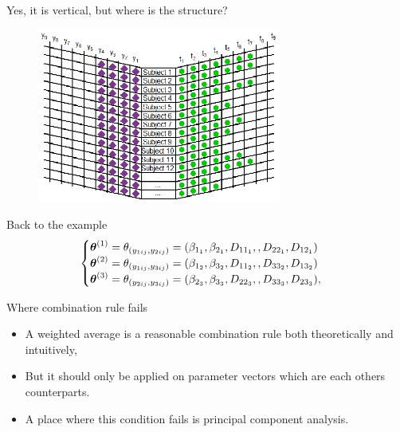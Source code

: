 \documentclass{beamer}
\newcommand{\bftheta}{\mbox{\boldmath $\theta$}}
\begin{document}
\begin{frame}{Yes, it is vertical, but where is the structure?}
\begin{figure}
\centering
\includegraphics[width=8cm]{long.eps}
\end{figure} 
\end{frame}

\begin{frame}{Back to the example}
\begin{equation*}
\begin{cases}
\bftheta^{(1)}=\theta_{(y_{1ij},y_{2ij})} = (\beta_{1_1},\beta_{2_1},D_{11_1},
,D_{22_1},D_{12_1}) \\
\bftheta^{(2)}=\theta_{(y_{1ij},y_{3ij})} = (\beta_{1_2},\beta_{3_2},D_{11_2},
,D_{33_2},D_{13_2}) \\
\bftheta^{(3)}=\theta_{(y_{2ij},y_{3ij})} = (\beta_{2_3},\beta_{3_3},D_{22_3},
,D_{33_3},D_{23_3}),
\end{cases}
\end{equation*}

\end{frame}

\begin{frame}{Where combination rule fails}

\begin{itemize}
\item A weighted average is a reasonable combination rule both theoretically and intuitively,
\item But it should only be applied on parameter vectors which are each others counterparts.
\item A place where this condition fails is principal component analysis.
\end{itemize}

\end{frame}
\end{document}
